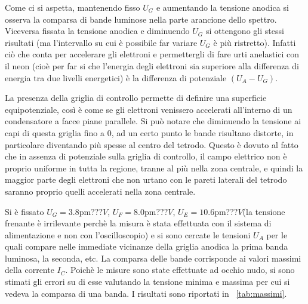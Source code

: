 \documentclass[10pt,a4paper]{article}
\begin{document}
Come ci si aspetta, mantenendo fisso $U_{G}$ e aumentando la tensione anodica si osserva la comparsa di bande luminose nella parte arancione dello spettro.
Viceversa fissata la tensione anodica e diminuendo $U_{G}$ si ottengono gli stessi risultati (ma l'intervallo su cui è possibile far variare $U_{G}$ è più ristretto). Infatti ciò che conta per accelerare gli elettroni e permettergli di fare urti anelastici con il neon (cioè per far si che l'energia degli elettroni sia superiore alla differenza di energia tra due livelli energetici) è la differenza di potenziale $(U_{A}-U_{G})$.

La presenza della griglia di controllo permette di definire una superficie equipotenziale, così è come se gli elettroni venissero accelerati all'interno di un condensatore a facce piane parallele. Si può notare che diminuendo la tensione ai capi di questa griglia fino a 0, ad un certo punto le bande risultano distorte, in particolare diventando più spesse al centro del tetrodo. Questo è dovuto al fatto che in assenza di potenziale sulla griglia di controllo, il campo elettrico non è proprio uniforme in tutta la regione, tranne al più nella zona centrale, e quindi la maggior parte degli elettroni che non urtano con le pareti laterali del tetrodo saranno proprio quelli accelerati nella zona centrale.


Si è fissato $U_{G} = \unit{3.8 \pm ???}{V}$, $U_{F}=\unit{8.0 \pm ???}{V}$, $U_{E} = \unit{10.6 \pm ???}{V}$(la tensione frenante è irrilevante perchè la misura è stata effettuata con il sistema di alimentazione e non con l'oscilloscopio) 
e si sono cercate le tensioni $U_{A}$ per le quali compare nelle immediate vicinanze della griglia anodica la prima banda luminosa, la seconda, etc. La comparsa delle bande corrisponde ai valori massimi della corrente $I_{C}$. Poichè le misure sono state effettuate ad occhio nudo, si sono stimati gli errori su di esse valutando la tensione minima e massima per cui si vedeva la comparsa di una banda. I risultati sono riportati in \tablename{~\ref{tab:massimi}}.
\end{document}
